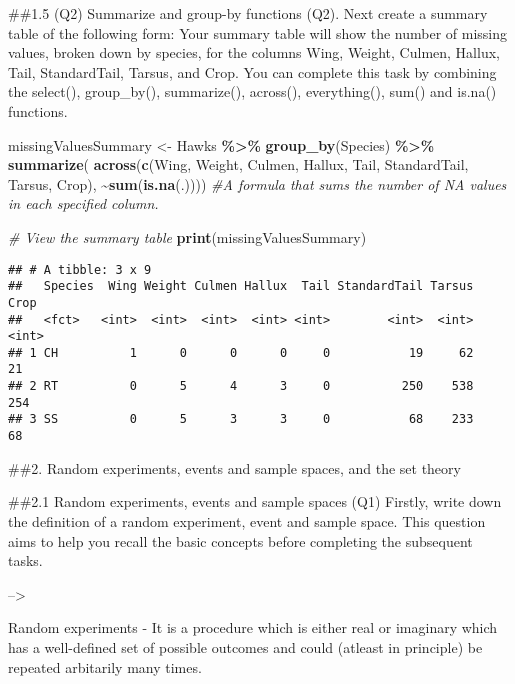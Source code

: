 \documentclass[
]{article}
\newenvironment{Shaded}{\begin{snugshade}}{\end{snugshade}}
\newcommand{\CommentTok}[1]{\textcolor[rgb]{0.56,0.35,0.01}{\textit{#1}}}
\newcommand{\FunctionTok}[1]{\textcolor[rgb]{0.13,0.29,0.53}{\textbf{#1}}}
\newcommand{\NormalTok}[1]{#1}
\newcommand{\OtherTok}[1]{\textcolor[rgb]{0.56,0.35,0.01}{#1}}
\newcommand{\SpecialCharTok}[1]{\textcolor[rgb]{0.81,0.36,0.00}{\textbf{#1}}}
\begin{document}
\#\#1.5 (Q2) Summarize and group-by functions (Q2). Next create a
summary table of the following form: Your summary table will show the
number of missing values, broken down by species, for the columns Wing,
Weight, Culmen, Hallux, Tail, StandardTail, Tarsus, and Crop. You can
complete this task by combining the select(), group\_by(), summarize(),
across(), everything(), sum() and is.na() functions.

\begin{Shaded}
\begin{Highlighting}[]
\NormalTok{missingValuesSummary }\OtherTok{\textless{}{-}}\NormalTok{ Hawks }\SpecialCharTok{\%\textgreater{}\%}
  \FunctionTok{group\_by}\NormalTok{(Species) }\SpecialCharTok{\%\textgreater{}\%}
  \FunctionTok{summarize}\NormalTok{( }\FunctionTok{across}\NormalTok{(}\FunctionTok{c}\NormalTok{(Wing, Weight, Culmen, Hallux, Tail, StandardTail, Tarsus, Crop), }\SpecialCharTok{\textasciitilde{}}\FunctionTok{sum}\NormalTok{(}\FunctionTok{is.na}\NormalTok{(.))))}
\CommentTok{\#A formula that sums the number of NA values in each specified column.}

\CommentTok{\# View the summary table}
\FunctionTok{print}\NormalTok{(missingValuesSummary)}
\end{Highlighting}
\end{Shaded}

\begin{verbatim}
## # A tibble: 3 x 9
##   Species  Wing Weight Culmen Hallux  Tail StandardTail Tarsus  Crop
##   <fct>   <int>  <int>  <int>  <int> <int>        <int>  <int> <int>
## 1 CH          1      0      0      0     0           19     62    21
## 2 RT          0      5      4      3     0          250    538   254
## 3 SS          0      5      3      3     0           68    233    68
\end{verbatim}

\#\#2. Random experiments, events and sample spaces, and the set theory

\#\#2.1 Random experiments, events and sample spaces (Q1) Firstly, write
down the definition of a random experiment, event and sample space. This
question aims to help you recall the basic concepts before completing
the subsequent tasks.

--\textgreater{}

Random experiments - It is a procedure which is either real or imaginary
which has a well-defined set of possible outcomes and could (atleast in
principle) be repeated arbitarily many times.
\end{document}
